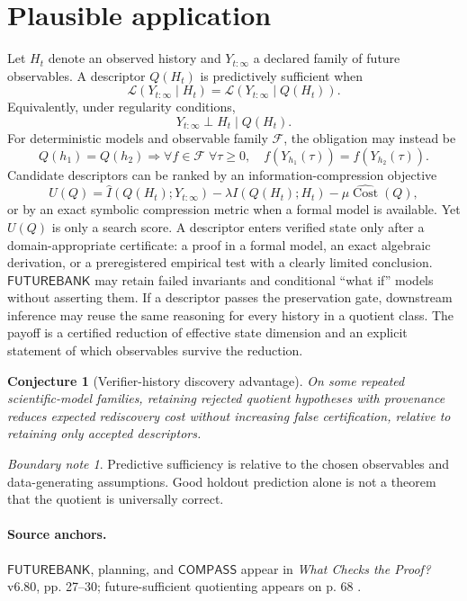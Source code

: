 \documentclass[11pt,oneside]{book}
\newtheorem{conjecture}[theorem]{Conjecture}
\theoremstyle{definition}
\theoremstyle{remark}
\newtheorem{boundary}[theorem]{Boundary note}
\newcommand{\FB}{\mathsf{FUTUREBANK}}
\newcommand{\COMPASS}{\mathsf{COMPASS}}
\newcommand{\Cost}{\operatorname{Cost}}
\begin{document}
\section{Plausible application}
Let \(H_t\) denote an observed history and \(Y_{t:\infty}\) a declared family of future observables.
A descriptor \(Q(H_t)\) is predictively sufficient when
\[
\mathcal L(Y_{t:\infty}\mid H_t)
=\mathcal L(Y_{t:\infty}\mid Q(H_t)).
\]
Equivalently, under regularity conditions,
\[
Y_{t:\infty}\perp H_t\mid Q(H_t).
\]
For deterministic models and observable family \(\mathcal F\), the obligation may instead be
\[
Q(h_1)=Q(h_2)
\Rightarrow
\forall f\in\mathcal F\;\forall\tau\ge0,
\quad f(Y_{h_1}(\tau))=f(Y_{h_2}(\tau)).
\]
Candidate descriptors can be ranked by an information-compression objective
\[
U(Q)=\widehat I(Q(H_t);Y_{t:\infty})
-\lambda I(Q(H_t);H_t)
-\mu\widehat{\Cost}(Q),
\]
or by an exact symbolic compression metric when a formal model is available. Yet \(U(Q)\) is only
a search score. A descriptor enters verified state only after a domain-appropriate certificate: a
proof in a formal model, an exact algebraic derivation, or a preregistered empirical test with a clearly
limited conclusion. \(\FB\) may retain failed invariants and conditional ``what if'' models without
asserting them. If a descriptor passes the preservation gate, downstream inference may reuse the same
reasoning for every history in a quotient class. The payoff is a certified reduction of effective state
dimension and an explicit statement of which observables survive the reduction.

\begin{conjecture}[Verifier-history discovery advantage]
On some repeated scientific-model families, retaining rejected quotient hypotheses with provenance
reduces expected rediscovery cost without increasing false certification, relative to retaining only
accepted descriptors.
\end{conjecture}

\begin{boundary}
Predictive sufficiency is relative to the chosen observables and data-generating assumptions. Good
holdout prediction alone is not a theorem that the quotient is universally correct.
\end{boundary}

\paragraph{Source anchors.} \(\FB\), planning, and \(\COMPASS\) appear in
\emph{What Checks the Proof?} v6.80, pp. 27--30; future-sufficient quotienting appears on p. 68
\cite{TennesonChecks}.
\end{document}
